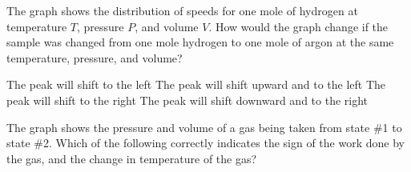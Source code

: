 \documentclass{../../../oss-ap12ibhl}
\begin{document}
\begin{questions}
%
%  
%    
    
  \question The graph shows the distribution of speeds for one mole of hydrogen
  at temperature $T$, pressure $P$, and volume $V$. How would the graph change
  if the sample was changed from one mole hydrogen to one mole of argon at the
  same temperature, pressure, and volume?

  \begin{minipage}{.37\textwidth}
  \end{minipage}
  \begin{minipage}{.6\textwidth}
    \begin{choices}
      \choice The peak will shift to the left
      \choice The peak will shift upward and to the left
      \choice The peak will shift to the right
      \choice The peak will shift downward and to the right
    \end{choices}
  \end{minipage}
  \newpage
  
  \question The graph shows the pressure and volume of a gas being taken from
  state \#1 to state \#2. Which of the following correctly indicates the sign of
  the work done by the gas, and the change in temperature of the gas?


\end{questions}
\end{document}
